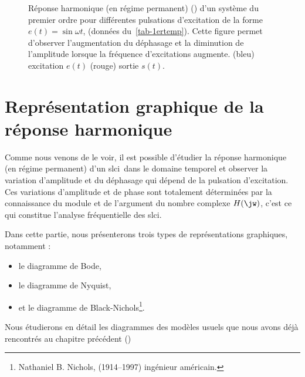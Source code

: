 \begin{figure}[!h]
    \centering
    
    
    
\caption{Réponse harmonique (en régime permanent) () d'un système 
         du premier ordre pour différentes pulsations d'excitation de la forme 
         $e(t)=\sin{\omega t}$, (données du~\cref{tab-1ertemp}). Cette figure
         permet d'observer l'augmentation du déphasage et la diminution de 
         l'amplitude lorsque la fréquence d'excitations augmente. (bleu) 
         excitation $e(t)$ (rouge) sortie $s(t)$.\label{fig-repham}}
\end{figure}

\newpage
\section{Représentation graphique de la réponse harmonique}


Comme nous venons de le voir, il est possible d'étudier
la réponse harmonique (en régime permanent) d'un \gls{slci}~dans le domaine 
temporel et observer la variation d'amplitude et du 
déphasage qui dépend de la pulsation d'excitation. Ces variations 
d'amplitude et de phase sont totalement déterminées par la 
connaissance du module et de l'argument du nombre complexe $H(\jw)$, 
c'est ce qui constitue l'analyse fréquentielle des \gls{slci}.

Dans cette partie, nous présenterons trois types de représentations graphiques, 
notamment :
\begin{itemize}
    \item le diagramme de Bode,
    \item le diagramme de Nyquist,
    \item et le diagramme de Black-Nichols\footnote{
    Nathaniel B. Nichols, (1914–1997) 
           ingénieur américain.}. 
\end{itemize}
Nous étudierons en détail les diagrammes des modèles usuels que nous 
avons déjà rencontrés au chapitre précédent ()

